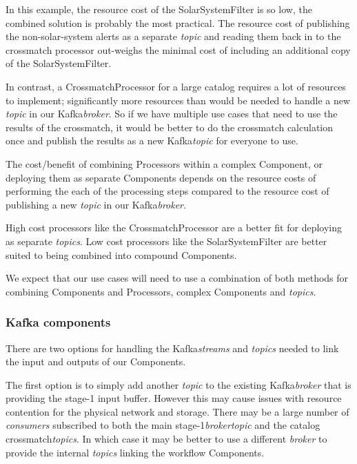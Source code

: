 \documentclass{article}
\newcommand{\kafka} {Kafka\xspace}
\newcommand{\kftopic} {\textit{topic}\xspace}
\newcommand{\kftopics} {\textit{topics}\xspace}
\newcommand{\kfstreams} {\textit{streams}\xspace}
\newcommand{\kfbroker} {\textit{broker}\xspace}
\newcommand{\kfconsumers} {\textit{consumers}\xspace}
\newcommand{\crossmatch} {crossmatch\xspace}
\newcommand{\stageone} {stage-1\xspace}
\newcommand{\javaname}[1] {{\ttfamily\color{codeblue} #1}}
\newcommand{\javaplural}[1] {\javaname{#1}s}
\begin{document}
In this example, the resource cost of the \javaname{SolarSystemFilter} is so low, the combined solution is probably the most practical. The resource cost of publishing the non-solar-system alerts as a separate \kftopic and reading them back in to the \crossmatch processor out-weighs the minimal cost of including an additional copy of the \javaname{SolarSystemFilter}.

In contrast, a \javaname{CrossmatchProcessor} for a large catalog requires a lot of resources to implement; significantly more resources than would be needed to handle a new \kftopic in our \kafka \kfbroker. So if we have multiple use cases that need to use the results of the \crossmatch, it would be better to do the \crossmatch calculation once and publish the results as a new \kafka \kftopic for everyone to use.

The cost/benefit of combining \javaplural{Processor} within a complex \javaname{Component}, or deploying them as separate \javaplural{Component} depends on the resource costs of performing the each of the processing steps compared to the resource cost of publishing a new \kftopic in our \kafka \kfbroker.

High cost processors like the \javaname{CrossmatchProcessor} are a better fit for deploying as separate \kftopics. Low cost processors like the \javaname{SolarSystemFilter} are better suited to being combined into compound \javaname{Components}.

We expect that our use cases will need to use a combination of both methods for combining \javaplural{Component} and \javaplural{Processor}, complex \javaplural{Component} and \kftopics.

\subsubsection{Kafka components}
\label{workflow.kafka-components}

There are two options for handling the \kafka \kfstreams and \kftopics needed to link the input and outputs of our \javaplural{Component}. 

The first option is to simply add another \kftopic to the existing \kafka \kfbroker that is providing the \stageone input buffer. However this may cause issues with resource contention for the physical network and storage.
There may be a large number of \kfconsumers subscribed to both the main \stageone \kfbroker \kftopic and the catalog \crossmatch \kftopics.
In which case it may be better to use a different \kfbroker to provide the internal \kftopics linking the workflow \javaplural{Component}.
\end{document}

